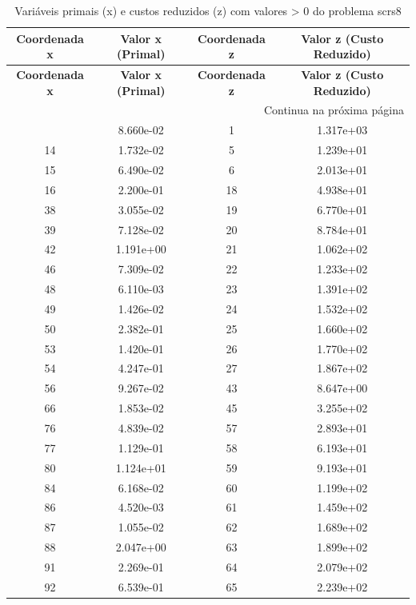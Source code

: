 \documentclass[12pt]{article}
\begin{document}
\begin{longtable}{@{}cccc@{}}
\caption{Variáveis primais (x) e custos reduzidos (z) com valores > 0 do problema scrs8} \\
\toprule
\textbf{Coordenada x} & \textbf{Valor x (Primal)} & \textbf{Coordenada z} & \textbf{Valor z (Custo Reduzido)} \\
\midrule
\endfirsthead

\toprule
\textbf{Coordenada x} & \textbf{Valor x (Primal)} & \textbf{Coordenada z} & \textbf{Valor z (Custo Reduzido)} \\
\midrule
\endhead

\midrule \multicolumn{4}{r}{{Continua na próxima página}} \\ \midrule
\endfoot

\bottomrule
\endlastfoot
9 & 8.660e-02 & 1 & 1.317e+03 \\
14 & 1.732e-02 & 5 & 1.239e+01 \\
15 & 6.490e-02 & 6 & 2.013e+01 \\
16 & 2.200e-01 & 18 & 4.938e+01 \\
38 & 3.055e-02 & 19 & 6.770e+01 \\
39 & 7.128e-02 & 20 & 8.784e+01 \\
42 & 1.191e+00 & 21 & 1.062e+02 \\
46 & 7.309e-02 & 22 & 1.233e+02 \\
48 & 6.110e-03 & 23 & 1.391e+02 \\
49 & 1.426e-02 & 24 & 1.532e+02 \\
50 & 2.382e-01 & 25 & 1.660e+02 \\
53 & 1.420e-01 & 26 & 1.770e+02 \\
54 & 4.247e-01 & 27 & 1.867e+02 \\
56 & 9.267e-02 & 43 & 8.647e+00 \\
66 & 1.853e-02 & 45 & 3.255e+02 \\
76 & 4.839e-02 & 57 & 2.893e+01 \\
77 & 1.129e-01 & 58 & 6.193e+01 \\
80 & 1.124e+01 & 59 & 9.193e+01 \\
84 & 6.168e-02 & 60 & 1.199e+02 \\
86 & 4.520e-03 & 61 & 1.459e+02 \\
87 & 1.055e-02 & 62 & 1.689e+02 \\
88 & 2.047e+00 & 63 & 1.899e+02 \\
91 & 2.269e-01 & 64 & 2.079e+02 \\
92 & 6.539e-01 & 65 & 2.239e+02 \\

\end{longtable}
\end{document}
